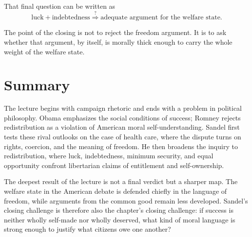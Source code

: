 That final question can be written as
\begin{equation}
\text{luck} + \text{indebtedness}
\stackrel{?}{\Longrightarrow}
\text{adequate argument for the welfare state}.
\end{equation}

The point of the closing is not to reject the freedom argument. It is to ask whether that argument, by itself, is morally thick enough to carry the whole weight of the welfare state.

\section{Summary}

The lecture begins with campaign rhetoric and ends with a problem in political philosophy. Obama emphasizes the social conditions of success; Romney rejects redistribution as a violation of American moral self-understanding. Sandel first tests these rival outlooks on the case of health care, where the dispute turns on rights, coercion, and the meaning of freedom. He then broadens the inquiry to redistribution, where luck, indebtedness, minimum security, and equal opportunity confront libertarian claims of entitlement and self-ownership.

The deepest result of the lecture is not a final verdict but a sharper map. The welfare state in the American debate is defended chiefly in the language of freedom, while arguments from the common good remain less developed. Sandel's closing challenge is therefore also the chapter's closing challenge: if success is neither wholly self-made nor wholly deserved, what kind of moral language is strong enough to justify what citizens owe one another?